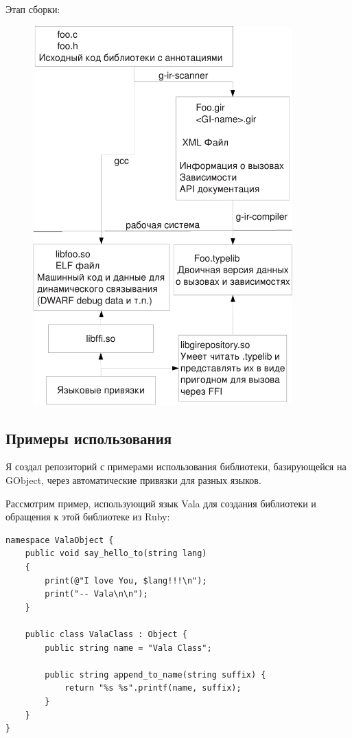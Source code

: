 \documentclass[10pt, a5paper]{article}
\begin{document}
  Этап сборки:
  
 \begin{figure}[htpb]
  \centering
  \includegraphics[width=10cm]{103_2012_antono-crop}
  \label{fig:Antono1}
\end{figure}

\subsection*{Примеры использования}

Я создал репозиторий \cite{Antono2} с примерами использования библиотеки,
базирующейся на GObject, через автоматические привязки для разных языков.

Рассмотрим пример, использующий язык Vala для создания библиотеки и
обращения к этой библиотеке из Ruby:

\begin{verbatim}
namespace ValaObject {
	public void say_hello_to(string lang)
	{
		print(@"I love You, $lang!!!\n");
		print("-- Vala\n\n");
	}

	public class ValaClass : Object {
		public string name = "Vala Class";

		public string append_to_name(string suffix) {
			return "%s %s".printf(name, suffix);
		}
	}
}
\end{verbatim}
\end{document}
